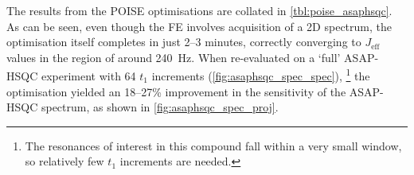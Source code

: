 The results from the POISE optimisations are collated in \cref{tbl:poise_asaphsqc}.
As can be seen, even though the FE involves acquisition of a 2D spectrum, the optimisation itself completes in just 2--3 minutes, correctly converging to $J_\text{eff}$ values in the region of around \qty{240}{\Hz}.
When re-evaluated on a `full' ASAP-HSQC experiment with 64 $t_1$ increments (\cref{fig:asaphsqc_spec_spec}),%
\footnote{The \carbon{} resonances of interest in this compound fall within a very small window, so relatively few $t_1$ increments are needed.}
the optimisation yielded an 18--27\% improvement in the sensitivity of the ASAP-HSQC spectrum, as shown in \cref{fig:asaphsqc_spec_proj}.
